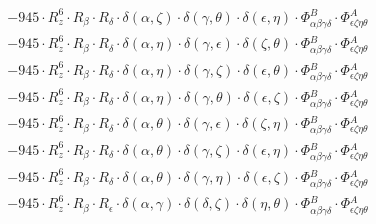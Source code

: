 \documentclass{article}
\begin{document}
\begin{equation}
\begin{array}{c}
 \\[0.2em] 		 - 945 \cdot R_{z}^{6} \cdot R_{\beta{}} \cdot R_{\delta{}} \cdot \delta{}\left(\alpha{}, \zeta{}\right) \cdot \delta{}\left(\gamma{}, \theta{}\right) \cdot \delta{}\left(\epsilon{}, \eta{}\right) \cdot \Phi{}^{B}_{\alpha{}\beta{}\gamma{}\delta{}} \cdot \Phi{}^{A}_{\epsilon{}\zeta{}\eta{}\theta{}} 
 \\[0.2em] 		 - 945 \cdot R_{z}^{6} \cdot R_{\beta{}} \cdot R_{\delta{}} \cdot \delta{}\left(\alpha{}, \eta{}\right) \cdot \delta{}\left(\gamma{}, \epsilon{}\right) \cdot \delta{}\left(\zeta{}, \theta{}\right) \cdot \Phi{}^{B}_{\alpha{}\beta{}\gamma{}\delta{}} \cdot \Phi{}^{A}_{\epsilon{}\zeta{}\eta{}\theta{}} 
 \\[0.2em] 		 - 945 \cdot R_{z}^{6} \cdot R_{\beta{}} \cdot R_{\delta{}} \cdot \delta{}\left(\alpha{}, \eta{}\right) \cdot \delta{}\left(\gamma{}, \zeta{}\right) \cdot \delta{}\left(\epsilon{}, \theta{}\right) \cdot \Phi{}^{B}_{\alpha{}\beta{}\gamma{}\delta{}} \cdot \Phi{}^{A}_{\epsilon{}\zeta{}\eta{}\theta{}} 
 \\[0.2em] 		 - 945 \cdot R_{z}^{6} \cdot R_{\beta{}} \cdot R_{\delta{}} \cdot \delta{}\left(\alpha{}, \eta{}\right) \cdot \delta{}\left(\gamma{}, \theta{}\right) \cdot \delta{}\left(\epsilon{}, \zeta{}\right) \cdot \Phi{}^{B}_{\alpha{}\beta{}\gamma{}\delta{}} \cdot \Phi{}^{A}_{\epsilon{}\zeta{}\eta{}\theta{}} 
 \\[0.2em] 		 - 945 \cdot R_{z}^{6} \cdot R_{\beta{}} \cdot R_{\delta{}} \cdot \delta{}\left(\alpha{}, \theta{}\right) \cdot \delta{}\left(\gamma{}, \epsilon{}\right) \cdot \delta{}\left(\zeta{}, \eta{}\right) \cdot \Phi{}^{B}_{\alpha{}\beta{}\gamma{}\delta{}} \cdot \Phi{}^{A}_{\epsilon{}\zeta{}\eta{}\theta{}} 
 \\[0.2em] 		 - 945 \cdot R_{z}^{6} \cdot R_{\beta{}} \cdot R_{\delta{}} \cdot \delta{}\left(\alpha{}, \theta{}\right) \cdot \delta{}\left(\gamma{}, \zeta{}\right) \cdot \delta{}\left(\epsilon{}, \eta{}\right) \cdot \Phi{}^{B}_{\alpha{}\beta{}\gamma{}\delta{}} \cdot \Phi{}^{A}_{\epsilon{}\zeta{}\eta{}\theta{}} 
 \\[0.2em] 		 - 945 \cdot R_{z}^{6} \cdot R_{\beta{}} \cdot R_{\delta{}} \cdot \delta{}\left(\alpha{}, \theta{}\right) \cdot \delta{}\left(\gamma{}, \eta{}\right) \cdot \delta{}\left(\epsilon{}, \zeta{}\right) \cdot \Phi{}^{B}_{\alpha{}\beta{}\gamma{}\delta{}} \cdot \Phi{}^{A}_{\epsilon{}\zeta{}\eta{}\theta{}} 
 \\[0.2em] 		 - 945 \cdot R_{z}^{6} \cdot R_{\beta{}} \cdot R_{\epsilon{}} \cdot \delta{}\left(\alpha{}, \gamma{}\right) \cdot \delta{}\left(\delta{}, \zeta{}\right) \cdot \delta{}\left(\eta{}, \theta{}\right) \cdot \Phi{}^{B}_{\alpha{}\beta{}\gamma{}\delta{}} \cdot \Phi{}^{A}_{\epsilon{}\zeta{}\eta{}\theta{}} 

\end{array}
\end{equation}
\end{document}

